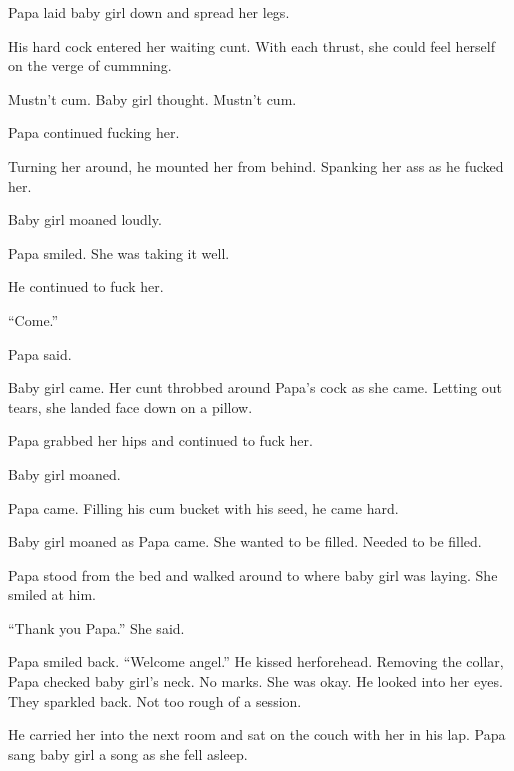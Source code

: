     Papa laid baby girl down and spread her legs.

    His hard cock entered her waiting cunt. With each thrust, she could feel herself on the verge of cummning.

    Mustn't cum. Baby girl thought. Mustn't cum.

    Papa continued fucking her.

    Turning her around, he mounted her from behind. Spanking her ass as he fucked her.

    Baby girl moaned loudly.

    Papa smiled. She was taking it well.

    He continued to fuck her.

    “Come.”

    Papa said.

    Baby girl came. Her cunt throbbed around Papa’s cock as she came. Letting out tears, she landed face down on a pillow.

    Papa grabbed her hips and continued to fuck her.

    Baby girl moaned.

    Papa came. Filling his cum bucket with his seed, he came hard.

    Baby girl moaned as Papa came. She wanted to be filled. Needed to be filled.

    Papa stood from the bed and walked around to where baby girl was laying. She smiled at him.

    “Thank you Papa.” She said.

    Papa smiled back. “Welcome angel.” He kissed herforehead. Removing the collar, Papa checked baby girl’s neck. No marks. She was okay. He looked into her eyes. They sparkled back. Not too rough of a session.

    He carried her into the next room and sat on the couch with her in his lap. Papa sang baby girl a song as she fell asleep.

